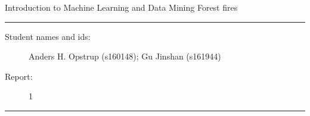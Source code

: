 \documentclass[11pt]{article}
\begin{document}
\begin{center}
{{\Large \sc Introduction to Machine Learning and Data Mining}} \newline	
{{\Large \sc Forest fires}}
\end{center}
\rule{\textwidth}{1pt}
\begin{description}
\item[Student names and ids:] Anders H. Opstrup (s160148); Gu Jinshan (s161944)
\item[Report:] 1
\end{description}
\rule{\textwidth}{1pt}









\end{document}

